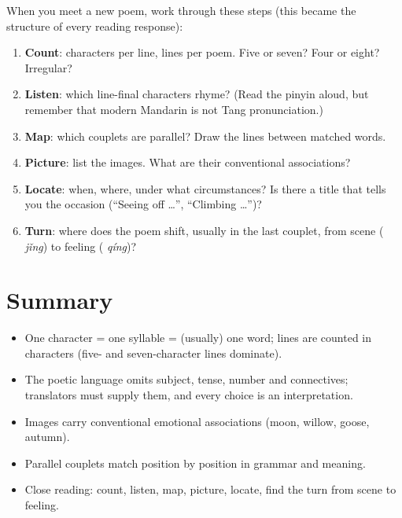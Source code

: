 When you meet a new poem, work through these steps (this became the structure of every
reading response):
\begin{enumerate}
  \item \textbf{Count}: characters per line, lines per poem. Five or seven? Four or eight?
        Irregular?
  \item \textbf{Listen}: which line-final characters rhyme? (Read the pinyin aloud, but
        remember that modern Mandarin is not Tang pronunciation.)
  \item \textbf{Map}: which couplets are parallel? Draw the lines between matched words.
  \item \textbf{Picture}: list the images. What are their conventional associations?
  \item \textbf{Locate}: when, where, under what circumstances? Is there a title that
        tells you the occasion (``Seeing off \ldots'', ``Climbing \ldots'')?
  \item \textbf{Turn}: where does the poem shift, usually in the last couplet, from scene
        ( \emph{jǐng}) to feeling ( \emph{qíng})?
\end{enumerate}

\section*{Summary}
\begin{itemize}
  \item One character = one syllable = (usually) one word; lines are counted in
        characters (five- and seven-character lines dominate).
  \item The poetic language omits subject, tense, number and connectives; translators must
        supply them, and every choice is an interpretation.
  \item Images carry conventional emotional associations (moon, willow, goose, autumn).
  \item Parallel couplets match position by position in grammar and meaning.
  \item Close reading: count, listen, map, picture, locate, find the turn from scene to
        feeling.
\end{itemize}
